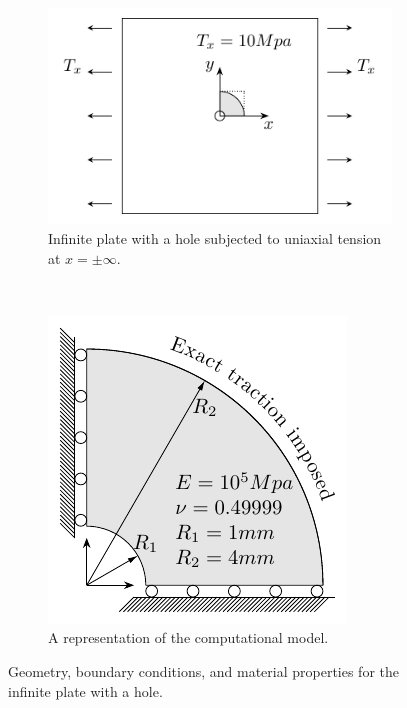 \begin{figure}[htb!]
    \centering
    \begin{subfigure}[t]{0.5\textwidth}
        \centering
        \includegraphics[width=1\linewidth]{Platewithhole}
        \caption{Infinite plate with a hole subjected to uniaxial tension at $x=\pm\infty$.}
        \label{fig:platewithhole_geometry_a}
    \end{subfigure}%
    ~
    \begin{subfigure}[t]{0.5\textwidth}
        \centering
        \includegraphics[width=1\linewidth]{Platewithhole_b}
        \caption{A representation of the computational model.}
        \label{fig:platewithhole_geometry_b}
    \end{subfigure}
    \caption{Geometry, boundary conditions, and material properties for the infinite plate with a hole.}
    \label{fig:platewithhole_geometry}
\end{figure}

